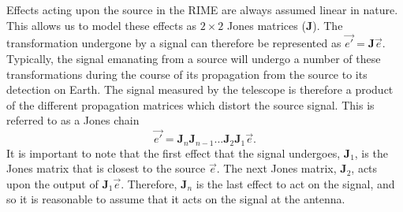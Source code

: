 \documentclass{article}
\begin{document}
Effects acting upon the source in the RIME are always assumed linear in nature. This allows us to model these effects as $2 \times 2$ Jones matrices ($\mathbf{J}$). The transformation undergone by a signal can therefore be represented as $\Vec{e'} = \mathbf{J}\Vec{e}$. Typically, the signal emanating from a source will undergo a number of these transformations during the course of its propagation from the source to its detection on Earth. The signal measured by the telescope is therefore a product of the different propagation matrices which distort the source signal. This is referred to as a Jones chain
\begin{equation}
\Vec{e'} = \mathbf{J}_{n} \mathbf{J}_{n-1}...\mathbf{J}_{2}\mathbf{J}_1 \Vec{e} .
\end{equation}
It is important to note that the first effect that the signal undergoes, $\mathbf{J}_1$, is the Jones matrix that is closest to the source $\Vec{e}$. The next Jones matrix, $\mathbf{J}_2$, acts upon the output of $\mathbf{J}_1\Vec{e}$. Therefore, $\mathbf{J}_n$ is the last effect to act on the signal, and so it is reasonable to assume that it acts on the signal at the antenna.
\end{document}
